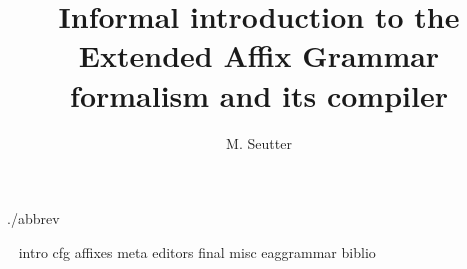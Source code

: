 \documentclass [a4paper,12pt,fleqn]{book}
\title {\Huge Informal introduction to the\\
Extended Affix Grammar \\
formalism and its compiler}
\author {M. Seutter}
\begin{document}
 {./abbrev}
\maketitle
\pagestyle {empty}
~
\newpage
\pagestyle {esprit}
\setcounter{page}{1}
 {intro}
 {cfg}
 {affixes}
 {meta}
 {editors}
 {final}
\appendix
 {misc}
 {eaggrammar}
 {biblio}
\tableofcontents
\end{document}
